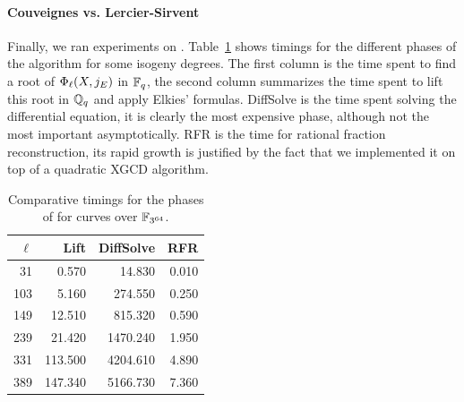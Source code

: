 \paragraph{Couveignes vs. Lercier-Sirvent}
Finally, we ran experiments on
. 
Table~\ref{tab:ls} shows
timings for the different phases of the algorithm for some isogeny
degrees. The first column is the time spent to find a root of
$\Phi_\ell(X,j_E)$ in $\mathbb{F}_q$, the second column summarizes the time
spent to lift this root in $\mathbb{Q}_q$ and apply Elkies'
formulas. DiffSolve is the time spent solving the differential
equation, it is clearly the most expensive phase, although not the
most important asymptotically. RFR is the time for rational fraction
reconstruction, its rapid growth is justified by the fact that we
implemented it on top of a quadratic XGCD algorithm.

\begin{table}
  \centering
  \begin{tabular}{r r r r}
    \hline
    $\ell$ & Lift & DiffSolve & RFR\\
    \hline
    31  &   0.570 &   14.830 & 0.010\\
    103 &   5.160 &  274.550 & 0.250\\
    149 &  12.510 &  815.320 & 0.590\\
    239 &  21.420 & 1470.240 & 1.950\\
    331 & 113.500 & 4204.610 & 4.890\\
    389 & 147.340 & 5166.730 & 7.360\\
  \end{tabular}
  \caption{Comparative timings for the phases of  
    for curves over $\mathbb{F}_{3^{64}}$.}
  \label{tab:ls}
\end{table}


